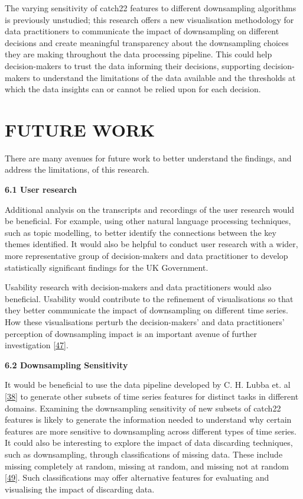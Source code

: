 \documentclass{article}
\begin{document}
The varying sensitivity of catch22 features to different downsampling
algorithms is previously unstudied; this research offers a new
visualisation methodology for data practitioners to communicate the
impact of downsampling on different decisions and create meaningful
transparency about the downsampling choices they are making throughout
the data processing pipeline. This could help decision-makers to trust
the data informing their decisions, supporting decision-makers to
understand the limitations of the data available and the thresholds at
which the data insights can or cannot be relied upon for each decision.

\hypertarget{future-work}{%
\section{FUTURE WORK}\label{future-work}}

There are many avenues for future work to better understand the
findings, and address the limitations, of this research.

\textbf{6.1 User research}

Additional analysis on the transcripts and recordings of the user
research would be beneficial. For example, using other natural language
processing techniques, such as topic modelling, to better identify the
connections between the key themes identified. It would also be helpful
to conduct user research with a wider, more representative group of
decision-makers and data practitioner to develop statistically
significant findings for the UK Government.

Usability research with decision-makers and data practitioners would
also beneficial. Usability would contribute to the refinement of
visualisations so that they better communicate the impact of
downsampling on different time series. How these visualisations perturb
the decision-makers' and data practitioners' perception of downsampling
impact is an important avenue of further investigation
\protect\hyperlink{ref-graphsampling}{{[}47{]}}.

\textbf{6.2 Downsampling Sensitivity}

It would be beneficial to use the data pipeline developed by C. H. Lubba
et. al \protect\hyperlink{ref-catch22}{{[}38{]}} to generate other
subsets of time series features for distinct tasks in different domains.
Examining the downsampling sensitivity of new subsets of catch22
features is likely to generate the information needed to understand why
certain features are more sensitive to downsampling across different
types of time series. It could also be interesting to explore the impact
of data discarding techniques, such as downsampling, through
classifications of missing data. These include missing completely at
random, missing at random, and missing not at random
\protect\hyperlink{ref-missingdata}{{[}49{]}}. Such classifications may
offer alternative features for evaluating and visualising the impact of
discarding data.
\end{document}
